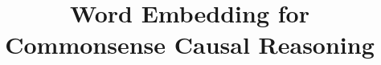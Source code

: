 \documentclass[conference]{IEEEtran}
\begin{document}
%
\title{Word Embedding for Commonsense Causal Reasoning}




% 
\end{document}

